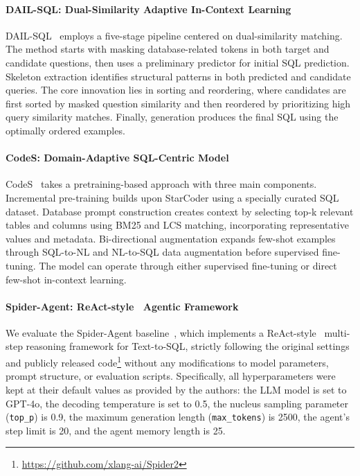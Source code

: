 \documentclass{article} %
\begin{document}
\paragraph{DAIL-SQL: Dual-Similarity Adaptive In-Context Learning}

DAIL-SQL~\citep{gao2023text} employs a five-stage pipeline centered on dual-similarity matching. The method starts with {masking} database-related tokens in both target and candidate questions, then uses a {preliminary predictor} for initial SQL prediction. {Skeleton extraction} identifies structural patterns in both predicted and candidate queries. The core innovation lies in {sorting and reordering}, where candidates are first sorted by masked question similarity and then reordered by prioritizing high query similarity matches. Finally, {generation} produces the final SQL using the optimally ordered examples.

\paragraph{CodeS: Domain-Adaptive SQL-Centric Model}

CodeS~\citep{CodeS} takes a pretraining-based approach with three main components. {Incremental pre-training} builds upon StarCoder using a specially curated SQL dataset. {Database prompt construction} creates context by selecting top-k relevant tables and columns using BM25 and LCS matching, incorporating representative values and metadata. {Bi-directional augmentation} expands few-shot examples through SQL-to-NL and NL-to-SQL data augmentation before supervised fine-tuning. The model can operate through either supervised fine-tuning or direct few-shot in-context learning.

\paragraph{Spider-Agent: ReAct-style~\citep{yao2023react} Agentic Framework}
We evaluate the Spider-Agent baseline~\citep{lei2024spider}, which implements a ReAct-style~\citep{yao2023react} multi-step reasoning framework for Text-to-SQL, strictly following the original settings and publicly released code\footnote{\url{https://github.com/xlang-ai/Spider2}} without any modifications to model parameters, prompt structure, or evaluation scripts. Specifically, all hyperparameters were kept at their default values as provided by the authors: the LLM model is set to GPT-4o, the decoding temperature is set to 0.5, the nucleus sampling parameter (\texttt{top\_p}) is 0.9, the maximum generation length (\texttt{max\_tokens}) is 2500, the agent's step limit is 20, and the agent memory length is 25.
\end{document}
